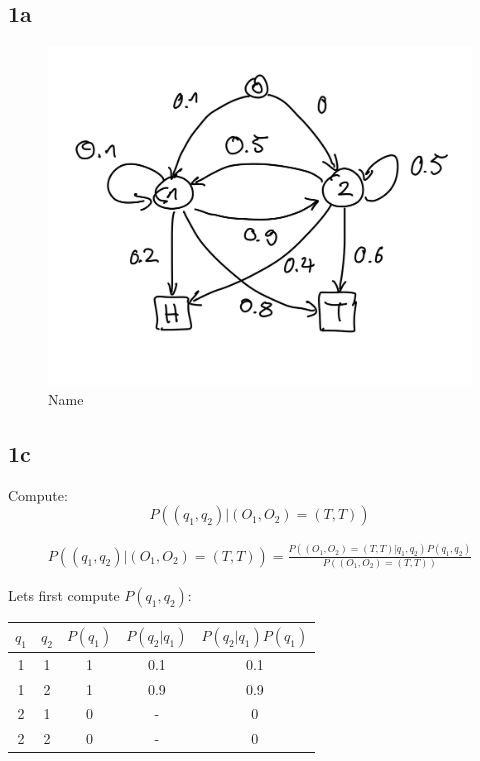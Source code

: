 \subsection*{1a}
\begin{figure}[h]
    \centering
    \includegraphics[width=0.8\linewidth]{hmm.png}
    \caption{Name}
    \label{fig:name}
\end{figure}

\subsection*{1c}

Compute:
\begin{equation}
    P((q_1, q_2 )| (O_1, O_2) = (T, T))
\end{equation}


\begin{align}
    P((q_1, q_2 )| (O_1, O_2) = (T, T)) =
    \frac{P((O_1, O_2) = (T, T) | q_1, q_2) P(q_1, q_2)}
    {P((O_1, O_2) = (T, T))}
\end{align}

Lets first compute $P(q_1, q_2)$:

\begin{center}
\begin{tabular}{c | c | c | c | c}
    $q_1$ & $q_2$ & $P(q_1)$ &  $P(q_2|q_1)$ & $P(q_2| q_1) P(q_1) $\\ \hline
    1       & 1   &   1      &    0.1        &   0.1 \\
    1       & 2   &   1      &    0.9        &   0.9 \\
    2       & 1   &   0      &    -        &   0 \\
    2       & 2   &   0      &    -        &   0 \\
\end{tabular}
\end{center}

